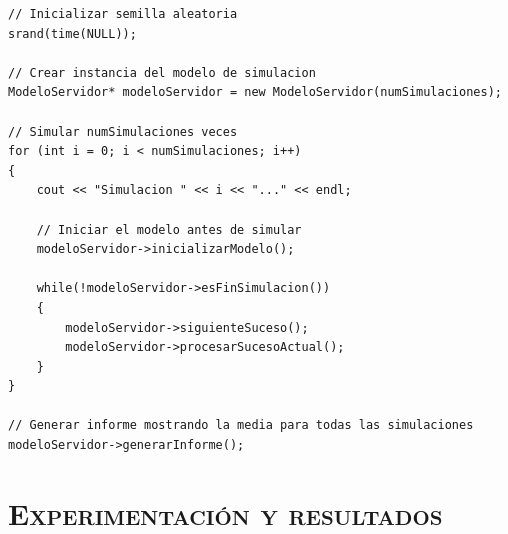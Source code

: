 \documentclass[11pt,a4paper]{article}
\begin{document}
\begin{lstlisting}
// Inicializar semilla aleatoria
srand(time(NULL));

// Crear instancia del modelo de simulacion
ModeloServidor* modeloServidor = new ModeloServidor(numSimulaciones);

// Simular numSimulaciones veces
for (int i = 0; i < numSimulaciones; i++)
{
    cout << "Simulacion " << i << "..." << endl;

    // Iniciar el modelo antes de simular
    modeloServidor->inicializarModelo();

    while(!modeloServidor->esFinSimulacion())
    {
    	modeloServidor->siguienteSuceso();
        modeloServidor->procesarSucesoActual();
	}
}

// Generar informe mostrando la media para todas las simulaciones
modeloServidor->generarInforme();
\end{lstlisting}



\section{\textsc{Experimentación y resultados}}
\end{document}
